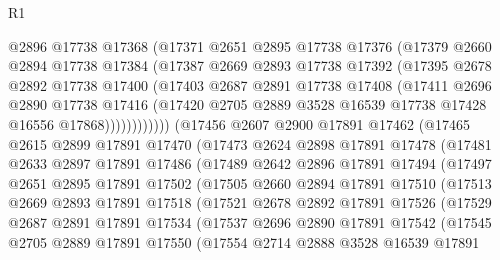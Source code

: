 \begin{lexlean}{R1}
\begin{coremodule}
              @2896
              @17738
              @17368
              (@17371
                @2651
                @2895
                @17738
                @17376
                (@17379
                  @2660
                  @2894
                  @17738
                  @17384
                  (@17387
                    @2669
                    @2893
                    @17738
                    @17392
                    (@17395
                      @2678
                      @2892
                      @17738
                      @17400
                      (@17403
                        @2687
                        @2891
                        @17738
                        @17408
                        (@17411
                          @2696
                          @2890
                          @17738
                          @17416
                          (@17420 @2705 @2889 @3528 @16539 @17738 @17428 @16556 @17868))))))))))))
    (@17456
      @2607
      @2900
      @17891
      @17462
      (@17465
        @2615
        @2899
        @17891
        @17470
        (@17473
          @2624
          @2898
          @17891
          @17478
          (@17481
            @2633
            @2897
            @17891
            @17486
            (@17489
              @2642
              @2896
              @17891
              @17494
              (@17497
                @2651
                @2895
                @17891
                @17502
                (@17505
                  @2660
                  @2894
                  @17891
                  @17510
                  (@17513
                    @2669
                    @2893
                    @17891
                    @17518
                    (@17521
                      @2678
                      @2892
                      @17891
                      @17526
                      (@17529
                        @2687
                        @2891
                        @17891
                        @17534
                        (@17537
                          @2696
                          @2890
                          @17891
                          @17542
                          (@17545
                            @2705
                            @2889
                            @17891
                            @17550
                            (@17554
                              @2714
                              @2888
                              @3528
                              @16539
                              @17891

\end{coremodule}
\end{lexlean}
